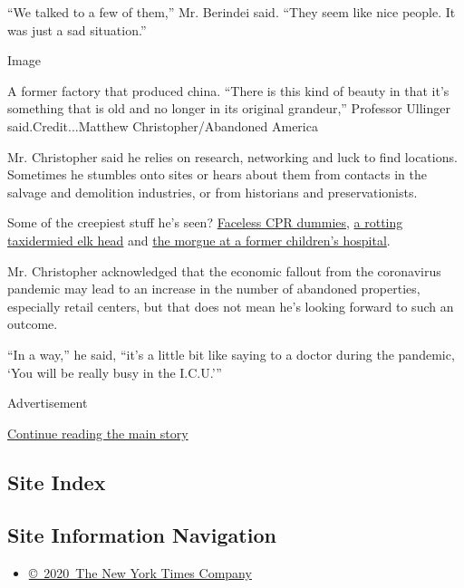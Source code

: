 ``We talked to a few of them,'' Mr. Berindei said. ``They seem like nice
people. It was just a sad situation.''

Image

A former factory that produced china. ``There is this kind of beauty in
that it's something that is old and no longer in its original
grandeur,'' Professor Ullinger said.Credit...Matthew
Christopher/Abandoned America

Mr. Christopher said he relies on research, networking and luck to find
locations. Sometimes he stumbles onto sites or hears about them from
contacts in the salvage and demolition industries, or from historians
and preservationists.

Some of the creepiest stuff he's seen?
\href{https://twitter.com/abandonedameric/status/1057725225205465089?s=20}{Faceless
CPR dummies},
\href{https://twitter.com/abandonedameric/status/1057737618702692352}{a
rotting taxidermied elk head} and
\href{https://twitter.com/abandonedameric/status/1157330150515761153}{the
morgue at a former children's hospital}.

Mr. Christopher acknowledged that the economic fallout from the
coronavirus pandemic may lead to an increase in the number of abandoned
properties, especially retail centers, but that does not mean he's
looking forward to such an outcome.

``In a way,'' he said, ``it's a little bit like saying to a doctor
during the pandemic, `You will be really busy in the I.C.U.'''

Advertisement

\protect\hyperlink{after-bottom}{Continue reading the main story}

\hypertarget{site-index}{%
\subsection{Site Index}\label{site-index}}

\hypertarget{site-information-navigation}{%
\subsection{Site Information
Navigation}\label{site-information-navigation}}

\begin{itemize}
\tightlist
\item
  \href{https://help.nytimes.com/hc/en-us/articles/115014792127-Copyright-notice}{©~2020~The
  New York Times Company}
\end{itemize}

